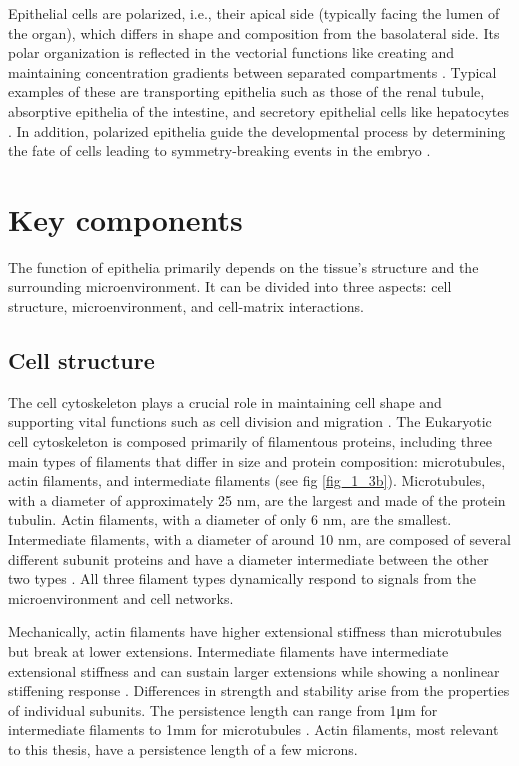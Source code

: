Epithelial cells are polarized, i.e., their apical side (typically facing the lumen of the organ), which differs in shape and composition from the basolateral side. Its polar organization is reflected in the vectorial functions like creating and maintaining concentration gradients between separated compartments \cite{marchiando2010}. Typical examples of these are transporting epithelia such as those of the renal tubule, absorptive epithelia of the intestine, and secretory epithelial cells like hepatocytes \cite{alberts2015}. In addition, polarized epithelia guide the developmental process by determining the fate of cells leading to symmetry-breaking events in the embryo \cite{kim2018}.

\hypertarget{key-components}{%
	\section{Key components}\label{key-components}}

The function of epithelia primarily depends on the tissue's structure and the surrounding microenvironment. It can be divided into three aspects: cell structure, microenvironment, and cell-matrix interactions.

\hypertarget{cell-structure}{%
	\subsection{Cell structure}\label{cell-structure}}

The cell cytoskeleton plays a crucial role in maintaining cell shape and supporting vital functions such as cell division and migration \cite{alberts2015}. The Eukaryotic cell cytoskeleton is composed primarily of filamentous proteins, including three main types of filaments that differ in size and protein composition: microtubules, actin filaments, and intermediate filaments (see fig \ref{fig_1_3b}). Microtubules, with a diameter of approximately 25 nm, are the largest and made of the protein tubulin. Actin filaments, with a diameter of only 6 nm, are the smallest. Intermediate filaments, with a diameter of around 10 nm, are composed of several different subunit proteins and have a diameter intermediate between the other two types \cite{mofrad2009}. All three filament types dynamically respond to signals from the microenvironment and cell networks.

Mechanically, actin filaments have higher extensional stiffness than microtubules but break at lower extensions. Intermediate filaments have intermediate extensional stiffness and can sustain larger extensions while showing a nonlinear stiffening response \cite{wen2011}. Differences in strength and stability arise from the properties of individual subunits. The persistence length can range from 1\unit{\um} for intermediate filaments to 1\unit{\mm} for microtubules \cite{fletcher2010}. Actin filaments, most relevant to this thesis, have a persistence length of a few microns.


